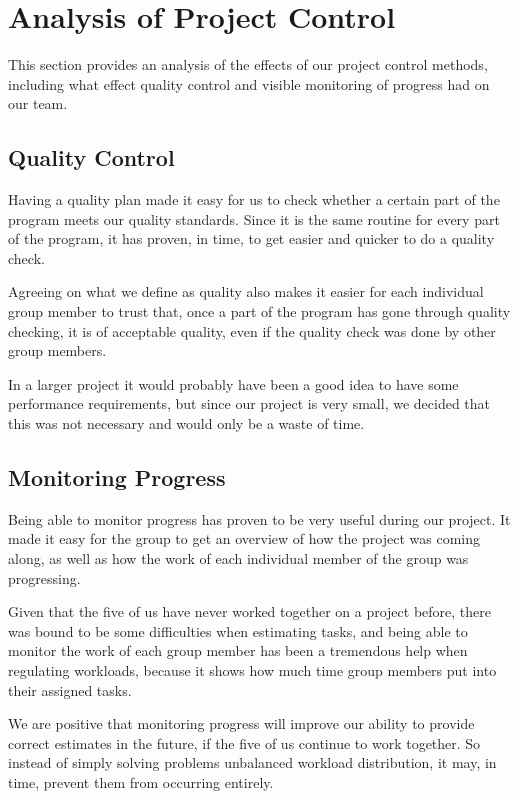\section{Analysis of Project Control}
This section provides an analysis of the effects of our project control methods,
including what effect quality control and visible monitoring of progress had on
our team.

\subsection{Quality Control}
\label{sec:AnalysisQualityControl}
Having a quality plan made it easy for us to check whether a certain part of the
program meets our quality standards. Since it is the same routine for every part
of the program, it has proven, in time, to get easier and quicker to do a quality
check.

Agreeing on what we define as quality also makes it easier for each individual
group member to trust that, once a part of the program has gone through quality
checking, it is of acceptable quality, even if the quality check was done by
other group members.

In a larger project it would probably have been a good idea to have some
performance requirements, but since our project is very small, we decided that
this was not necessary and would only be a waste of time.

\subsection{Monitoring Progress}
\label{sec:AnalysisProgress}
Being able to monitor progress has proven to be very useful during our project. It
made it easy for the group to get an overview of how the project was coming along,
as well as how the work of each individual member of the group was progressing.

Given that the five of us have never worked together on a project before, there was
bound to be some difficulties when estimating tasks, and being able to monitor the
work of each group member has been a tremendous help when regulating workloads,
because it shows how much time group members put into their assigned tasks.

We are positive that monitoring progress will improve our ability to provide correct
estimates in the future, if the five of us continue to work together. So instead of
simply solving problems unbalanced workload distribution, it may, in time, prevent
them from occurring entirely.